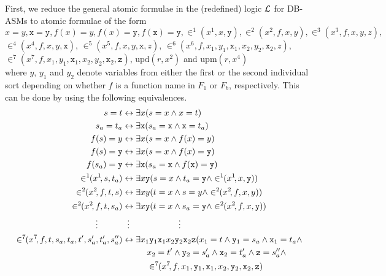 \documentclass[preprint,11pt]{elsarticle}
\theoremstyle{definition}
\theoremstyle{remark}
\begin{document}
First, we reduce the general atomic formulae in the (redefined) logic ${\cal L}$ for DB-ASMs to atomic formulae of the form
\\[0.2cm]
$x=y, \mathtt{x} = \mathtt{y}, f(x)=y, f(x) = \mathtt{y}, f(\mathtt{x}) = \mathtt{y}, \in^1\!\!(x^1\!,x,\mathtt{y}), \in^2\!\!(x^2\!,f,x,y), \in^3\!\!(x^3\!,f,x,y,z),$\\[0.2cm]
$\in^4\!\!(x^4\!,f,x,y,\mathtt{x})$, $\in^5\!\!(x^5\!,f,x,y,\mathtt{x},z)$, $\in^6\!\!(x^6\!, f,x_1,y_1,\mathtt{x}_1, x_2,y_2,\mathtt{x}_2, z)$, \\[0.2cm]
$\in^7\!\!(x^7\!,f,x_1,y_1,\mathtt{x}_1, x_2,y_2,\mathtt{x}_2,\mathtt{z})$, $\mathrm{upd}(r, x^2)$ and $\mathrm{upm}(r, x^4)$ \\[0.2cm] where $y$, $y_1$ and $y_2$ denote variables from either the first or the second individual sort depending on whether $f$ is a function name in $F_1$ or $F_b$, respectively. This can be done by using the following equivalences.
\begin{align*}
s=t &\leftrightarrow \exists x (s = x \wedge x = t)\\
s_a = t_a &\leftrightarrow \exists \mathtt{x} (s_a = \mathtt{x} \wedge \mathtt{x} = t_a)\\
f(s)=y &\leftrightarrow \exists x (s = x \wedge f(x) = y)\\
f(s)=\mathtt{y} &\leftrightarrow \exists x (s = x \wedge f(x) = \mathtt{y})\\
f(s_a)=\mathtt{y} &\leftrightarrow \exists \mathtt{x} (s_a = \mathtt{x} \wedge f(\mathtt{x}) = \mathtt{y})\\
\in^1\!\!(x^1\!,s,t_a) &\leftrightarrow \exists x \mathtt{y} (s = x \wedge t_a = \mathtt{y} \wedge \in^1\!\!(x^1\!,x,\mathtt{y}))\\
\in^2\!\!(x^2\!,f,t,s) &\leftrightarrow \exists x y (t = x \wedge s = y \wedge \in^2\!\!(x^2\!,f,x,y))\\
\in^2\!\!(x^2\!,f,t,s_a) &\leftrightarrow \exists x \mathtt{y} (t = x \wedge s_a = \mathtt{y} \wedge \in^2\!\!(x^2\!,f,x,\mathtt{y}))\\
\vdots\hspace*{1cm} & \hspace*{0.2cm}\vdots \hspace{2cm} \vdots\\
\in^7\!\!(x^7\!,f,t,s_a,t_a, t',s_a',t_a',s_a^{\prime\prime})&\leftrightarrow \exists x_1 \mathtt{y}_1 \mathtt{x}_1 x_2 \mathtt{y}_2 \mathtt{x}_2 \mathtt{z} (x_1 = t \wedge \mathtt{y}_1 = s_a \wedge \mathtt{x}_1 = t_a \wedge\\
&\hspace*{1cm} x_2 = t' \wedge \mathtt{y}_2 = s_a' \wedge \mathtt{x}_2 = t_a' \wedge \mathtt{z} = s_a^{\prime\prime} \wedge\\
&\hspace*{1cm} \in^7\!\!(x^7\!,f,x_1,\mathtt{y}_1,\mathtt{x}_1, x_2,\mathtt{y}_2,\mathtt{x}_2,\mathtt{z})
\end{align*}
\end{document}
